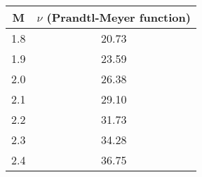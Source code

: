 \begin{tabular}[12pt]{ |c| c|}
    \hline
    \textbf{M} & $\nu$ \textbf{(Prandtl-Meyer function)}\\ 
    \hline
    1.8 & 20.73 \\
    \hline
    1.9 & 23.59 \\
    \hline
    2.0 & 26.38 \\
    \hline
    2.1 & 29.10 \\
    \hline
    2.2 & 31.73 \\
    \hline
    2.3 & 34.28 \\
    \hline
    2.4 & 36.75 \\
    \hline
    \end{tabular}
